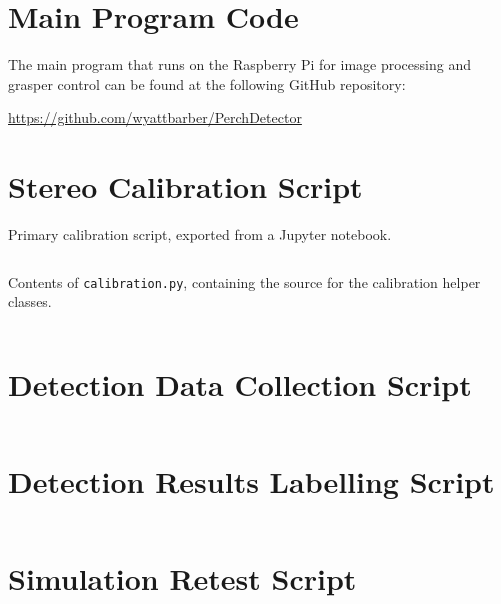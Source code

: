 \documentclass{article}
\begin{document}
\begin{appendices}
    \section{Main Program Code}
    \label{app:main-code}

    The main program that runs on the Raspberry Pi for image processing and grasper 
    control can be found at the following GitHub repository:

    \url{https://github.com/wyattbarber/PerchDetector}    

    \section{Stereo Calibration Script}
    \label{app:cal-code}

    Primary calibration script, exported from a Jupyter notebook.

    \inputminted[linenos, frame=lines, breaklines]{python}{"C:/Users/wyatt/Documents/GVSU/Thesis/calibration and tuning/calibration/calibration export.py"}

    Contents of \texttt{calibration.py}, containing the source for the calibration helper classes.

    \inputminted[linenos, frame=lines, breaklines]{python}{"C:/Users/wyatt/Documents/GVSU/Thesis/calibration and tuning/calibration/calibration.py"}


    \section{Detection Data Collection Script}
    \label{app:data-coll-code}

    \inputminted[linenos, frame=lines, breaklines]{python}{"C:/Users/wyatt/Documents/GVSU/Thesis/PerchDetector/datacollector.py"}

    
    \section{Detection Results Labelling Script}
    \label{app:label-code}

    \inputminted[linenos, frame=lines, breaklines]{python}{"C:/Users/wyatt/Documents/GVSU/Thesis/august_test_data/passfail.py"}

    \section{Simulation Retest Script}
    \label{app:retest-code}

    \inputminted[linenos, frame=lines, breaklines]{python}{"C:/Users/wyatt/Documents/GVSU/Thesis/PerchDetector/sim-retest.py"}

\end{appendices}


\end{document}
